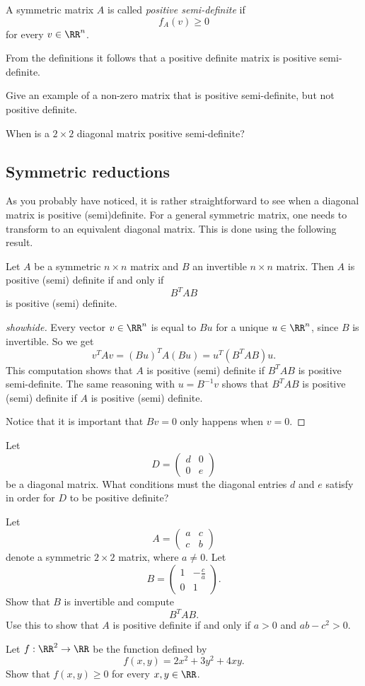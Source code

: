 \documentclass{article}
\begin{document}
A symmetric matrix $A$ is called \emph{positive semi-definite} if
$$
f_A(v) \geq 0
$$
for every $v\in \RR^n$.

From the definitions it follows that a positive definite matrix is
positive semi-definite.

\beginshex
Give an example of a non-zero matrix that is positive semi-definite,
but not positive definite.

When is a $2\times 2$ diagonal matrix positive semi-definite?
\endshex


\subsection{Symmetric reductions}

As you probably have noticed, it is rather straightforward to
see when a diagonal matrix is positive (semi)definite. For a
general symmetric matrix, one needs to transform to
an equivalent diagonal matrix. This is done
using the following result.

\begin{proposition}
  Let $A$ be a symmetric $n\times n$ matrix and $B$ an
  invertible $n\times n$ matrix. Then $A$ is
  positive (semi) definite if and only if
  $$
  B^T A B
  $$
  is positive (semi) definite.
\end{proposition}
  \begin{proof}[showhide]
    Every vector $v\in \RR^n$ is equal to $B u$ for a unique $u\in \RR^n$,
    since $B$ is invertible. So we get
    $$
    v^T A v = (B u)^T A (B u) = u^T (B^T A B) u.
    $$
    This computation shows that $A$ is positive (semi) definite if
    $B^T A B$ is positive semi-definite. The same
    reasoning with $u = B^{-1} v$ shows that $B^T A B$ is
    positive (semi) definite if $A$ is positive (semi) definite.

    Notice that it is important that $B v = 0$ only happens
    when $v=0$.
  \end{proof}


\beginshex
Let
$$
D =
\begin{pmatrix}
  d & 0\\
  0 & e
\end{pmatrix}
$$
be a diagonal matrix. What conditions must the diagonal
entries $d$ and $e$ satisfy in order for
$D$ to be positive definite?

Let
$$
A =
\begin{pmatrix}
  a & c\\
  c & b
\end{pmatrix}
$$
denote a symmetric $2\times 2$ matrix, where $a\neq 0$. Let
$$
B =
\begin{pmatrix}
  1 & -\frac{c}{a}\\
  0 & 1
\end{pmatrix}.
$$
Show that $B$ is invertible and compute
$$
B^T A B.
$$
Use this to show that $A$ is positive definite if and only if
$a>0$ and $a b - c^2 > 0$.

Let $f:\RR^2\rightarrow \RR$ be the function defined by
$$
f(x, y) = 2 x^2 + 3 y^2 + 4 x y.
$$
Show that $f(x, y)\geq 0$ for every $x, y\in \RR$.
\endshex
\end{document}
